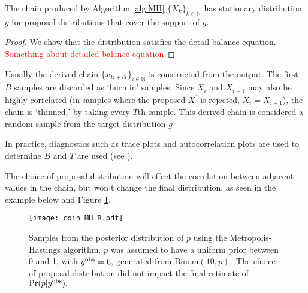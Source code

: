 \begin{theorem}
    The chain produced by Algorithm \ref{alg:MH} $\{X_k\}_{k\in \mathbb{N}}$
    has stationary distribution $g$ for proposal distributions that cover the
    support of $g.$
\end{theorem}

\begin{proof}
    We show that the distribution satisfies the detail balance equation.
    \textcolor{red}{Something about detailed balance equation}
\end{proof}

Usually the derived chain $\{x_{B + iT}\}_{i \in \mathbb{N}}$ is constructed
from the output. The
first $B$ samples are discarded as `burn in' samples.
Since $X_i$ and $X_{i + 1}$ may also be highly correlated (in samples where
the proposed $X^\prime$ is rejected, $X_i = X_{i + 1}$), the chain is
`thinned,' by taking every $T$th sample. This derived chain is considered a
random sample from the target distribution $g$

In practice, diagnostics such as trace plots and autocorrelation plots are used
to determine $B$ and $T$ are used (see
\cite[chapter 11]{gelman_bayesian_2014}).

The choice of proposal distribution will effect the correlation between
adjacent values in the chain, but won't change the final distribution, as seen
in the example below and Figure \ref{fig:coin_R}.

\begin{figure}[htbp]
    \centering
    \texttt{[image: coin\_MH\_R.pdf]}
    \caption{
        Samples from the posterior distribution of $p$ using the
        Metropolis-Hastings algorithm. $p$ was assumed to
        have a uniform prior between 0 and 1, with $y^{\mathrm{obs}} = 6,$ generated
        from $\mathrm{Binom}(10, p),$
        The choice of proposal distribution did not impact the final estimate
        of $\Pr(p | y^{\mathrm{obs}}).$
    }
    \label{fig:coin_R}
\end{figure}


